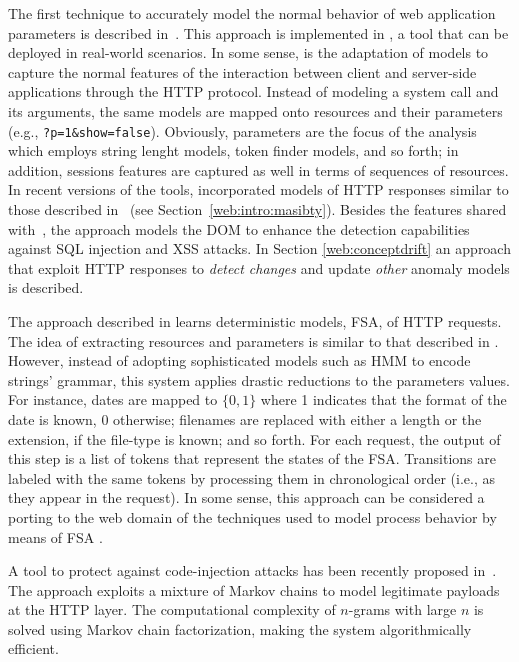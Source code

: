 The first technique to accurately model the normal behavior of web
application parameters is described
in~\citep{kruegel:jcn2005:webanomaly}. This approach is implemented in
\webanomaly, a tool that can be deployed in real-world scenarios. In
some sense, \webanomaly \citep{webanomalysite} is the adaptation of
\LibAnomaly models to capture the normal features of the interaction
between client and server-side applications through the
\ac{HTTP} protocol. Instead of modeling a system call and
its arguments, the same models are mapped onto resources and their
parameters (e.g., \texttt{?p=1\&show=false}). Obviously, parameters
are the focus of the analysis which employs string lenght models,
token finder models, and so forth; in addition, sessions features are
captured as well in terms of sequences of resources. In recent
versions of the tools, \webanomaly incorporated models of
\ac{HTTP} responses similar to those described
in~\citep{masibty} (see Section~\ref{web:intro:masibty}). Besides the
features shared with~\citep{kruegel:jcn2005:webanomaly}, the approach
models the \ac{DOM} to enhance the detection capabilities
against \ac{SQL} injection and \ac{XSS} attacks. In Section
\ref{web:conceptdrift} an approach that exploit \ac{HTTP}
responses to \emph{detect changes} and update \emph{other} anomaly
models is described.

The approach described in \citep{ingham:2007:dfa} learns deterministic
models, \ac{FSA}, of \ac{HTTP} requests. The idea of
extracting resources and parameters is similar to that described in
\citep{kruegel:jcn2005:webanomaly}. However, instead of adopting
sophisticated models such as \ac{HMM} to encode strings' grammar, this
system applies drastic reductions to the parameters values. For
instance, dates are mapped to $\{0,1\}$ where 1 indicates that the
format of the date is known, 0 otherwise; filenames are replaced with
either a length or the extension, if the file-type is known; and so
forth. For each request, the output of this step is a list of tokens
that represent the states of the \ac{FSA}. Transitions are labeled
with the same tokens by processing them in chronological order (i.e.,
as they appear in the request). In some sense, this approach can be
considered a porting to the web domain of the techniques used to model
process behavior by means of \ac{FSA}
\citep{wagner:sp2001:staticanalysis,venkat_dataflow}.

A tool to protect against code-injection attacks has been recently
proposed in~\citep{song2009smm}. The approach exploits a mixture of
Markov chains to model legitimate payloads at the
\ac{HTTP} layer. The computational complexity of $n$-grams
with large $n$ is solved using Markov chain factorization, making the
system algorithmically efficient.

